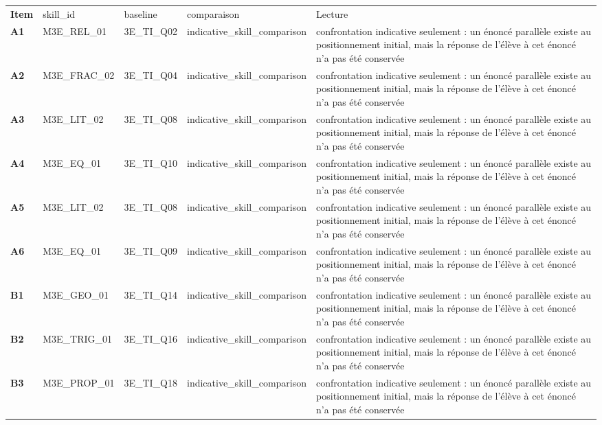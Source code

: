 \documentclass[10pt,a4paper]{article}
\begin{document}
\par\noindent\begin{tabularx}{\linewidth}{>{\bfseries}p{9mm} >{\ttfamily\scriptsize}p{25mm} >{\ttfamily\scriptsize}p{22mm} >{\ttfamily\scriptsize}p{16mm} X}
\rowcolor{Navy}\color{white}Item & \color{white}\scriptsize skill\_id & \color{white}\scriptsize baseline & \color{white}\scriptsize comparaison & \color{white}Lecture \\
A1 & M3E\_REL\_01 & 3E\_TI\_Q02 & indicative\_skill\_comparison & confrontation indicative seulement : un énoncé parallèle existe au positionnement initial, mais la réponse de l'élève à cet énoncé n'a pas été conservée \\
A2 & M3E\_FRAC\_02 & 3E\_TI\_Q04 & indicative\_skill\_comparison & confrontation indicative seulement : un énoncé parallèle existe au positionnement initial, mais la réponse de l'élève à cet énoncé n'a pas été conservée \\
A3 & M3E\_LIT\_02 & 3E\_TI\_Q08 & indicative\_skill\_comparison & confrontation indicative seulement : un énoncé parallèle existe au positionnement initial, mais la réponse de l'élève à cet énoncé n'a pas été conservée \\
A4 & M3E\_EQ\_01 & 3E\_TI\_Q10 & indicative\_skill\_comparison & confrontation indicative seulement : un énoncé parallèle existe au positionnement initial, mais la réponse de l'élève à cet énoncé n'a pas été conservée \\
A5 & M3E\_LIT\_02 & 3E\_TI\_Q08 & indicative\_skill\_comparison & confrontation indicative seulement : un énoncé parallèle existe au positionnement initial, mais la réponse de l'élève à cet énoncé n'a pas été conservée \\
A6 & M3E\_EQ\_01 & 3E\_TI\_Q09 & indicative\_skill\_comparison & confrontation indicative seulement : un énoncé parallèle existe au positionnement initial, mais la réponse de l'élève à cet énoncé n'a pas été conservée \\
B1 & M3E\_GEO\_01 & 3E\_TI\_Q14 & indicative\_skill\_comparison & confrontation indicative seulement : un énoncé parallèle existe au positionnement initial, mais la réponse de l'élève à cet énoncé n'a pas été conservée \\
B2 & M3E\_TRIG\_01 & 3E\_TI\_Q16 & indicative\_skill\_comparison & confrontation indicative seulement : un énoncé parallèle existe au positionnement initial, mais la réponse de l'élève à cet énoncé n'a pas été conservée \\
B3 & M3E\_PROP\_01 & 3E\_TI\_Q18 & indicative\_skill\_comparison & confrontation indicative seulement : un énoncé parallèle existe au positionnement initial, mais la réponse de l'élève à cet énoncé n'a pas été conservée \\

\end{tabularx}
\end{document}
